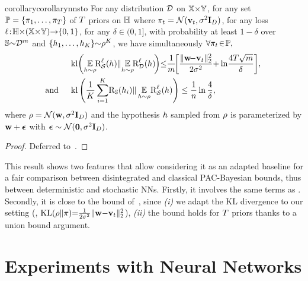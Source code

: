 \begin{restatable}{corollary}{corollarynnsto}\label{chap:dis-pra:corollary:nn-sto}
For any distribution $\mathcal{D}$ on $\mathbb{X}{\times}\mathbb{Y}$, for any set $\mathbb{P}=\{\pi_1,\dots, \pi_T\}$ of $T$ priors on $\mathbb{H}$ where $\pi_t=\mathcal{N}(\mathbf{v}_t, \sigma^2\mathbf{I}_D)$, for any loss $\ell\!:\! \mathbb{H}{\times} (\mathbb{X}{\times}\mathbb{Y}) {\to} \{0, 1\}$, for any $\delta{\in}(0,1]$, with probability at least $1{-}\delta$ over $\mathbb{S}{\sim}\mathcal{D}^m$ and $\{h_1,\dots,h_K\}{\sim}\rho^K$, we have simultaneously $\forall \pi_t\!\in\!\mathbb{P},$
\begin{align}
&\kl\!\left(\EE_{\h{\sim}\Q}\!\!\RiskLoss_{\dS}(\h)\|\! \EE_{\h{\sim}\Q}\!\!\RiskLoss_{\D}(\h)\!\right)\!
{\le} \frac{1}{\m}\!\!\LB 
\frac{\|\wbf\!{-}\vbf_\t\|_{2}^{2}}{2\sigma^2}
{+}\ln\!\frac{4\iter\sqrt{\m}}{\delta}\RB\!,\!\label{chap:dis-pra:eq:nn-sto-seeger}\\
\!\!\mbox{and }\quad  &\kl\LP{\frac{1}{\K}\sum_{i=1}^{\K}\!\Risk_{\S}(\h_i)}\|\EE_{\h{\sim}\Q}\!\RiskLoss_{\dS}(\h)\RP \le \frac1n \ln\frac{4}{\delta}, \label{chap:dis-pra:eq:nn-sto-sample}
\end{align}
where $\rho=\mathcal{N}(\mathbf{w}, \sigma^2\mathbf{I}_D)$ and the hypothesis $h$ sampled from $\rho$ is parameterized by $\mathbf{w}+\boldsymbol{\epsilon}$ with $\boldsymbol{\epsilon}\sim\mathcal{N}({\mathbf 0}, \sigma^2\mathbf{I}_D)$.
\end{restatable}
\begin{noaddcontents}\begin{proof}
Deferred to~.
\end{proof}\end{noaddcontents}

This result shows two features that allow considering it as an adapted baseline for a fair comparison 
between disintegrated and classical PAC-Bayesian bounds,  thus between deterministic and stochastic NNs.
Firstly, it involves the same terms as .
Secondly, it is close to the bound of~\citet[Sec.~6.2]{PerezOrtizRivasplataShaweTaylorSzepesvari2021}, since {\it (i)} we adapt the KL divergence to our setting (\ie, $\operatorname{KL}(\rho\|\pi){=}\tfrac{1}{2\sigma^2}\|\mathbf{w}{-}\mathbf{v}_t\|_2^2$), {\it (ii)} the bound holds for $T$ priors thanks to a union bound argument.

\section{Experiments with Neural Networks}
\label{chap:dis-pra:sec:expe}


